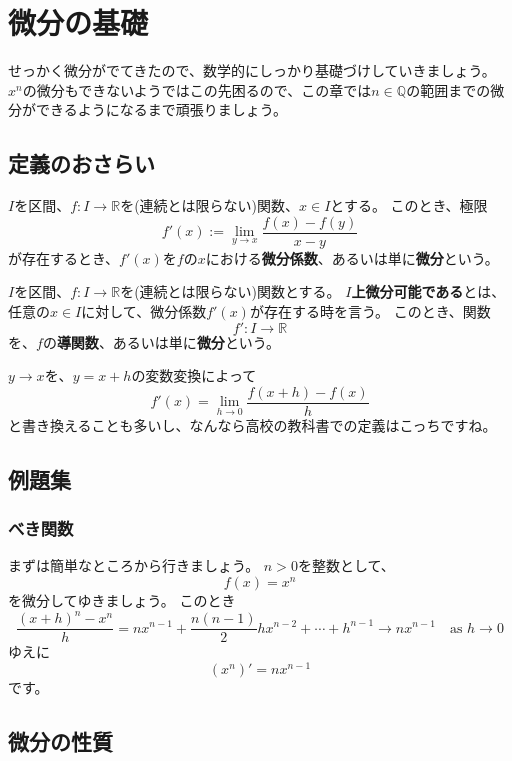 \chapter{微分の基礎}

せっかく微分がでてきたので、数学的にしっかり基礎づけしていきましょう。
$x^n$の微分もできないようではこの先困るので、この章では$n\in\mathbb{Q}$の範囲までの微分ができるようになるまで頑張りましょう。



\section{定義のおさらい}

\begin{definition}
  $I$を区間、$f:I\to\mathbb{R}$を(連続とは限らない)関数、$x\in I$とする。
  このとき、極限
  \[
    f'(x):=\lim_{y\to x}\frac{f(x)-f(y)}{x-y}
  \]
  が存在するとき、$f'(x)$を$f$の$x$における\textbf{微分係数}、あるいは単に\textbf{微分}という。
\end{definition}

\begin{definition}
  $I$を区間、$f:I\to\mathbb{R}$を(連続とは限らない)関数とする。
  \textbf{$I$上微分可能である}とは、任意の$x\in I$に対して、微分係数$f'(x)$が存在する時を言う。
  このとき、関数
  \[
    f':I\to\mathbb{R}
  \]
  を、$f$の\textbf{導関数}、あるいは単に\textbf{微分}という。
\end{definition}

$y\to x$を、$y=x+h$の変数変換によって
\[
  f'(x)=\lim_{h\to0}\frac{f(x+h)-f(x)}{h}
\]
と書き換えることも多いし、なんなら高校の教科書での定義はこっちですね。



\section{例題集}

\subsection{べき関数}

まずは簡単なところから行きましょう。
$n>0$を整数として、
\[
  f(x)=x^n
\]
を微分してゆきましょう。
このとき
\[
  \frac{(x+h)^n-x^n}{h}=nx^{n-1}+\frac{n(n-1)}{2}hx^{n-2}+\cdots+h^{n-1}\to nx^{n-1}\quad\text{as }h\to 0
\]
ゆえに
\[
  (x^n)'=nx^{n-1}
\]
です。



\section{微分の性質}

